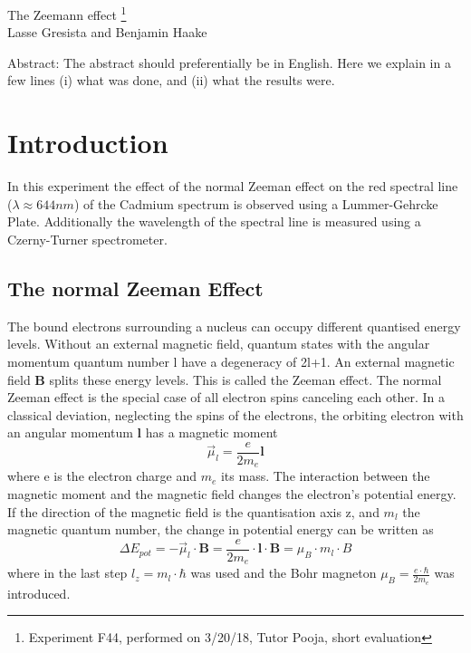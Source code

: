\documentclass[12pt]{article}
\begin{document}
\thispagestyle{empty}     %
\null
\vspace{40mm}
\begin{center}
{%
\Large  The Zeemann effect
\footnote{\noindent Experiment F44, performed on 3/20/18, Tutor Pooja, short evaluation}}\\[15mm]
Lasse Gresista and Benjamin Haake

\vspace{25mm}

\parbox{0.9\textwidth}{   %
Abstract:    
\small The abstract should preferentially be in English. Here we explain in a
few lines (i) what was done, and (ii) what the results were.
}
\end{center}

\vfill
\vspace{20mm}

\newpage  
\null\thispagestyle{empty}

\newpage
{}

\section{Introduction}
In this experiment the effect of the normal Zeeman effect on the red spectral line ($\lambda\approx644nm$) of the Cadmium spectrum is observed using a Lummer-Gehrcke Plate. Additionally the wavelength of the spectral line is measured using a Czerny-Turner spectrometer.

\subsection{The normal Zeeman Effect}
The bound electrons surrounding a nucleus can occupy different quantised energy levels. Without an external magnetic field, quantum states with the angular momentum quantum number l have a degeneracy of 2l+1. An external magnetic field \textbf{B} splits these energy levels. This is called the Zeeman effect. The normal Zeeman effect is the special case of all electron spins canceling each other. In a classical deviation, neglecting the spins of the electrons, the orbiting electron with an angular momentum \textbf{l} has a magnetic moment
\begin{equation}
\vec{\mu}_l=\frac{e}{2m_e}\textbf{l}
\end{equation}
where e is the electron charge and $m_e$ its mass. The interaction between the magnetic moment and the magnetic field changes the electron's potential energy. If the direction of the magnetic field is the quantisation axis z, and $m_l$ the magnetic quantum number, the change in potential energy can be written as
\begin{equation}
\Delta E_{pot}=-\vec{\mu}_l\cdot \textbf{B}=\frac{e}{2m_e}\cdot\textbf{l}\cdot\textbf{B}=\mu_B \cdot m_l \cdot B
\end{equation}
where in the last step $l_z=m_l\cdot\hbar$ was used and the Bohr magneton $\mu_B=\frac{e\cdot\hbar}{2m_e}$ was introduced.
\end{document}
